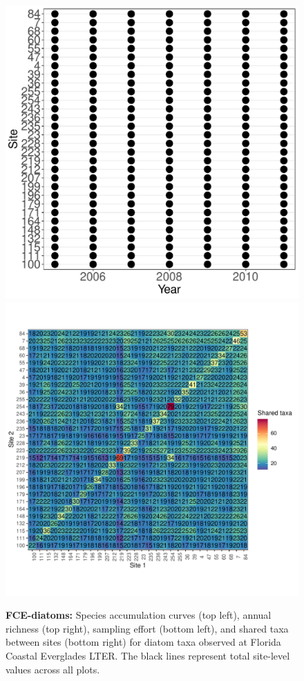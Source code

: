 \documentclass[11pt, oneside]{article}
\begin{document}
\begin{figure}[h!]
\includegraphics[scale = 0.4]{fce-diatoms-catano_spatiotemporal_sampling_effort.pdf}
\includegraphics[scale = 0.4]{fce-diatoms-catano_spp_shared.pdf}
\caption{{\bf FCE-diatoms:} Species accumulation curves (top left),  annual richness (top right), sampling effort (bottom left), and shared taxa between sites (bottom right) for diatom taxa observed at  Florida Coastal Everglades LTER. The black lines represent total site-level values across all plots.}
\label{fce-diatoms}
\end{figure}
\end{document}
